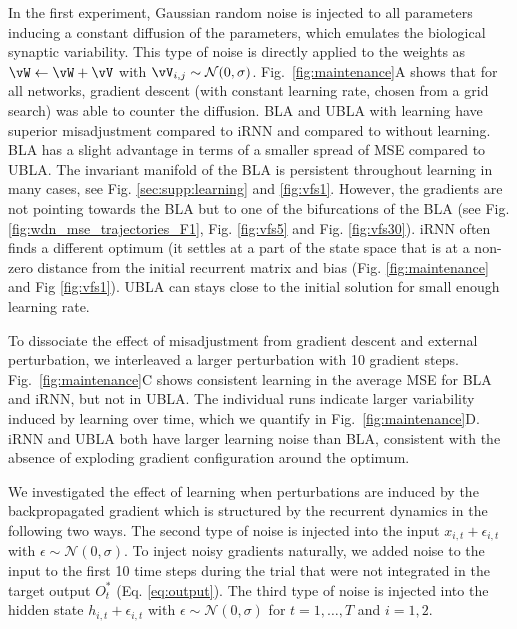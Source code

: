 \documentclass{article} %
\newcounter{ct}
\theoremstyle{definition}
\theoremstyle{remark}
\begin{document}
In the first experiment, Gaussian random noise is injected to all parameters inducing a constant diffusion of the parameters, which emulates the biological synaptic variability.
This type of noise is directly applied to the weights as $ \vW \leftarrow \vW + \vV$ with $\vV_{i,j}\sim\mathcal{N}(0,\sigma)$.
Fig.~\ref{fig:maintenance}A shows that for all networks, gradient descent (with constant learning rate, chosen from a grid search) was able to counter the diffusion.
BLA and UBLA with learning have superior misadjustment compared to iRNN and compared to without learning. BLA has a slight advantage in terms of a smaller spread of MSE compared to UBLA.
The invariant manifold of the BLA is persistent throughout learning in many cases, see Fig. \ref{sec:supp:learning} and \ref{fig:vfs1}. However, the gradients are not pointing towards the BLA but to one of the bifurcations of the BLA (see Fig. \ref{fig:wdn_mse_trajectories_F1}, Fig. \ref{fig:vfs5} and Fig. \ref{fig:vfs30}).
iRNN often finds a different optimum (it settles at a part of the state space that is at a non-zero distance from the initial recurrent matrix and bias (Fig. \ref{fig:maintenance} and Fig \ref{fig:vfs1}).
UBLA can stays close to the initial solution for small enough learning rate.

To dissociate the effect of misadjustment from gradient descent and external perturbation, we interleaved a larger perturbation with 10 gradient steps.
Fig.~\ref{fig:maintenance}C shows consistent learning in the average MSE for BLA and iRNN, but not in UBLA.
The individual runs indicate larger variability induced by learning over time, which we quantify in Fig.~\ref{fig:maintenance}D.
iRNN and UBLA both have larger learning noise than BLA, consistent with the absence of exploding gradient configuration around the optimum.

We investigated the effect of learning when perturbations are induced by the backpropagated gradient which is structured by the recurrent dynamics in the following two ways.
The second type of noise is injected into the input $x_{i,t}+\epsilon_{i,t}$ with $\epsilon\sim\mathcal{N}(0,\sigma)$.
To inject noisy gradients naturally, we added noise to the input to the first 10 time steps during the trial that were not integrated in the target output $O_t^*$ (Eq. \ref{eq:output}).
The third type of noise is injected into the hidden state $h_{i,t}+\epsilon_{i,t}$ with $\epsilon\sim\mathcal{N}(0,\sigma)$ for $t=1,\dots, T$ and $i=1,2$. 
\end{document}
